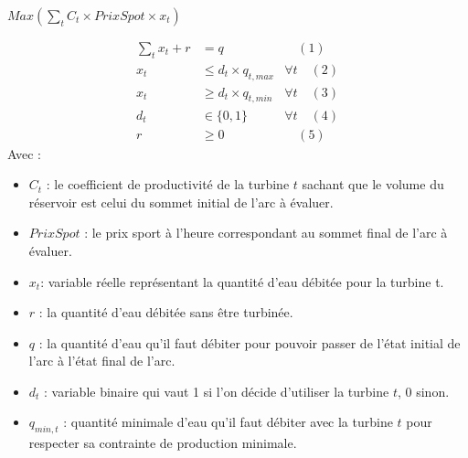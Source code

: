 \documentclass[a4paper]{report}
\begin{document}
\begin{center}
 $Max(\sum_t C_{t}\times PrixSpot \times x_{t})$
\end{center}
\[\begin{aligned}
\sum_{t} x_{t} + r &= q &\quad (1)\\
x_{t}  &\leq d_{t}\times q_{t,max} &\forall t\quad(2)\\
x_{t}  &\geq  d_{t}\times q_{t,min}  & \forall t\quad(3)\\
d_{t}  &\in \{0,1\}  & \forall t\quad(4)\\
r  &\geq 0  & \quad(5)
\end{aligned}\]
Avec :\\
\begin{itemize}
\item $C_{t}$ : le coefficient de productivité de la turbine $t$ sachant que le volume du réservoir est celui du sommet initial de l'arc à évaluer.
\item $PrixSpot$ : le prix sport à l'heure correspondant au sommet final de l'arc à évaluer.
\item $x_t$: variable réelle représentant la quantité d'eau débitée pour la turbine t.
\item $r$ : la quantité d'eau débitée sans être turbinée.
\item $q$ : la quantité d'eau qu'il faut débiter pour pouvoir passer de l'état initial de l'arc à l'état final de l'arc.
\item $d_t$ : variable binaire qui vaut 1 si l'on décide d'utiliser la turbine $t$, 0 sinon.
\item $q_{min,t}$ : quantité minimale d'eau qu'il faut débiter avec la turbine $t$ pour respecter sa contrainte de production minimale.
\end{itemize}
\end{document}
